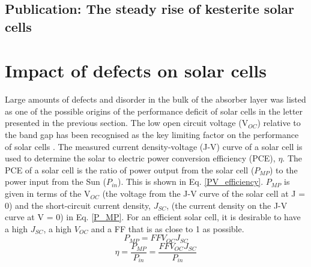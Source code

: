 \documentclass[11pt, twoside]{report}
\begin{document}
\subsection{Publication: The steady rise of kesterite solar cells}






\section{Impact of defects on {\CZTS} solar cells}\label{CZTS_defects_lit}
Large amounts of defects and disorder in the bulk of the absorber layer was listed as one of the possible origins of the performance deficit of {\CZTS} solar cells in the letter presented in the previous section.
The low open circuit voltage (V$_{OC}$) relative to the band gap has been recognised as the key limiting factor on the performance of {\CZTS} solar cells \cite{culprit}. 
The measured current density-voltage (J-V) curve of a solar cell is used to determine the solar to electric power conversion efficiency (PCE), $\eta$. The PCE of a solar cell is the ratio of power output from the solar cell ($P_{MP}$) to the power input from the Sun ($P_{in}$). This is shown in Eq. \ref{PV_efficiency}. $P_{MP}$ is given in terms of the V$_{OC}$ (the voltage from the J-V curve of the solar cell at J = 0) and the short-circuit current density, $J_{SC}$, (the current density on the J-V curve at V = 0) in Eq. \ref{P_MP}.
For an efficient solar cell, it is desirable to have a high $J_{SC}$, a high $V_{OC}$ and a FF that is as close to 1 as possible.
\begin{equation} \label{P_MP}
P_{MP} = FFV_{OC}J_{SC}
\end{equation}
\begin{equation} \label{PV_efficiency}
\eta = \frac{P_{MP}}{P_{in}} = \frac{FFV_{OC}J_{SC}}{P_{in}}
\end{equation}
\end{document}

